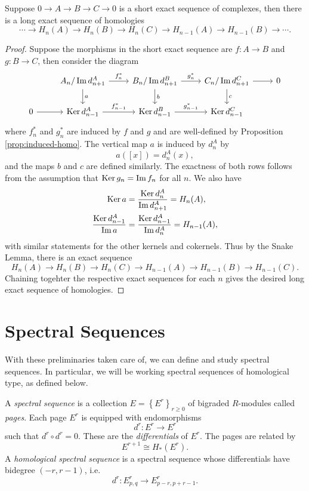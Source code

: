 \documentclass[twoside,10pt]{article}
\begin{document}
\begin{thrm}[]
\label{thrm:LES}
Suppose $0\to A\to B\to C\to 0$ is a short exact sequence of complexes, then there is a long exact sequence of homologies
\[
	\cdots \to H_{n}(A)\to H_{n}(B) \to H_{n}(C) \to H_{n-1}(A) \to H_{n-1}(B) \to  \cdots.
\] 
\end{thrm}
\begin{proof}
	Suppose the morphisms in the short exact sequence are $f:A\to B$ and $g:B\to C$, then consider the diagram
	\[
		\begin{tikzcd}
			&A_n/\im d_{n+1}^A\arrow[r,"f_n^*"]\arrow[d,"a"]&B_n/\im d_{n+1}^B\arrow[r,"g_n^*"]\arrow[d,"b"]&C_n/\im d_{n+1}^C\arrow[r]\arrow[d,"c"]&0 \\
			0\arrow[r]& \ker d_{n-1}^A\arrow[r,"f_{n-1}^*"]& \ker d_{n-1}^B\arrow[r,"g_{n-1}^*"]& \ker d_{n-1}^C
		\end{tikzcd}
	\]
	where $f_{n}^*$ and $g_{n}^*$ are induced by $f$ and $g$ and are well-defined by Proposition \ref{prop:induced-homo}. The vertical map $a$ is induced by $d_{n}^{A}$ by
	\[
		a([x]) = d_{n}^{A}(x),
	\] and the maps $b$ and $c$ are defined similarly. The exactness of both rows follows from the assumption that $\operatorname{Ker} g_{n}=\operatorname{Im} f_n$ for all $n$. We also have
	\begin{align*}
		\operatorname{Ker} a&=\frac{\operatorname{Ker} d_{n}^{A}}{\operatorname{Im} d_{n+1}^{A}} = H_{n}(A),\\
		\frac{\operatorname{Ker} d_{n-1}^{A}}{\operatorname{Im} a} &= \frac{\operatorname{Ker} d_{n-1}^A}{\operatorname{Im} d_{n}^A} = H_{n-1}(A),
	\end{align*}
	with similar statements for the other kernels and cokernels. Thus by the Snake Lemma, there is an exact sequence
	\[
		H_{n}(A) \to H_{n}(B)\to H_{n}(C)\to H_{n-1}(A)\to H_{n-1}(B)\to H_{n-1}(C).
	\] Chaining togehter the respective exact sequences for each $n$ gives the desired long exact sequence of homologies.
\end{proof}


\section{Spectral Sequences}

With these preliminaries taken care of, we can define and study spectral sequences. In particular, we will be working spectral sequences of homological type, as defined below.

\begin{defn}[]
A \textit{spectral sequence} is a collection $E = \left\{ E^{r} \right\}_{r\geq 0}$ of bigraded $R$-modules called \textit{pages}. Each page $E^{r}$ is equipped with endomorphisms
\[
d^{r}:E^{r}\to E^{r}
\] such that $d^{r}\circ d^{r}=0$. These are the \textit{differentials} of $E^{r}$. The pages are related by
\[
	E^{r+1} \cong H_*(E^{r}).
\] 
A \textit{homological spectral sequence} is a spectral sequence whose differentials have bidegree $(-r,r-1)$, i.e.
\[
d^{r}: E_{p,q}^{r}\to E_{p-r,p+r-1}^{r}.
\] 
\end{defn}
\end{document}
